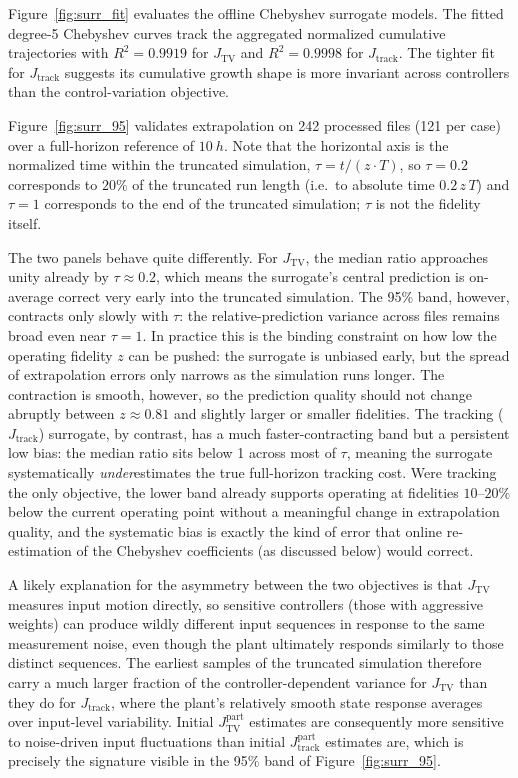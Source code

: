 \documentclass[11pt,a4paper]{article}
\newcommand{\jtrack}{J_{\mathrm{track}}}
\newcommand{\jtv}{J_{\mathrm{TV}}}
\begin{document}
Figure~\ref{fig:surr_fit} evaluates the offline Chebyshev surrogate models. The fitted degree-5 Chebyshev curves track the aggregated normalized cumulative trajectories with $R^2 = 0.9919$ for $\jtv$ and $R^2 = 0.9998$ for $\jtrack$. The tighter fit for $\jtrack$ suggests its cumulative growth shape is more invariant across controllers than the control-variation objective.

Figure~\ref{fig:surr_95} validates extrapolation on 242 processed files (121 per case) over a full-horizon reference of $\SI{10}{h}$. Note that the horizontal axis is the normalized time within the truncated simulation, $\tau = t/(z\cdot T)$, so $\tau = 0.2$ corresponds to $20\%$ of the truncated run length (i.e.\ to absolute time $0.2 \, z\, T$) and $\tau = 1$ corresponds to the end of the truncated simulation; $\tau$ is not the fidelity itself.

The two panels behave quite differently. For $\jtv$, the median ratio approaches unity already by $\tau \approx 0.2$, which means the surrogate's central prediction is on-average correct very early into the truncated simulation. The 95\% band, however, contracts only slowly with $\tau$: the relative-prediction variance across files remains broad even near $\tau = 1$. In practice this is the binding constraint on how low the operating fidelity $z$ can be pushed: the surrogate is unbiased early, but the spread of extrapolation errors only narrows as the simulation runs longer. The contraction is smooth, however, so the prediction quality should not change abruptly between $z \approx 0.81$ and slightly larger or smaller fidelities. The tracking ($\jtrack$) surrogate, by contrast, has a much faster-contracting band but a persistent low bias: the median ratio sits below 1 across most of $\tau$, meaning the surrogate systematically \emph{under}estimates the true full-horizon tracking cost. Were tracking the only objective, the lower band already supports operating at fidelities $10$--$20\%$ below the current operating point without a meaningful change in extrapolation quality, and the systematic bias is exactly the kind of error that online re-estimation of the Chebyshev coefficients (as discussed below) would correct.

A likely explanation for the asymmetry between the two objectives is that $\jtv$ measures input motion directly, so sensitive controllers (those with aggressive weights) can produce wildly different input sequences in response to the same measurement noise, even though the plant ultimately responds similarly to those distinct sequences. The earliest samples of the truncated simulation therefore carry a much larger fraction of the controller-dependent variance for $\jtv$ than they do for $\jtrack$, where the plant's relatively smooth state response averages over input-level variability. Initial $\jtv^{\mathrm{part}}$ estimates are consequently more sensitive to noise-driven input fluctuations than initial $\jtrack^{\mathrm{part}}$ estimates are, which is precisely the signature visible in the 95\% band of Figure~\ref{fig:surr_95}.
\end{document}
